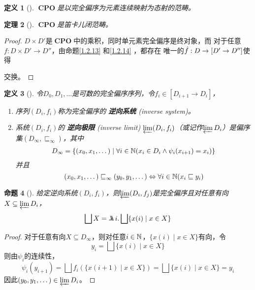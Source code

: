 \documentclass{jams-l}
\DeclareMathOperator{\CPO}{\textbf{CPO}}
\newtheorem{theorem}{定理}[section]
\newtheorem{proposition}[theorem]{命题}
\newtheorem{definition}[theorem]{定义}
\begin{document}
\begin{definition}[]
\(\CPO\)是以完全偏序为元素连续映射为态射的范畴。
\end{definition}

\begin{theorem}[]
\(\CPO\)是笛卡儿闭范畴。
\end{theorem}

\begin{proof}
\(D\times D'\)是\(\CPO\)中的乘积，同时单元素完全偏序是终对象，而
对于任意\(f:D\times D'\to D''\)，由命题\ref{1.2.13} 和\ref{1.2.14} ，都存在
唯一的\(\hat{f}:D\to[D'\to D'']\)使得
\begin{center}\end{center}
交换。
\end{proof}

\begin{definition}[]
令\(D_0,D_1,\dots\)是可数的完全偏序序列，令\(f_i\in[D_{i+1}\to D_i]\)，
\begin{enumerate}
\item 序列\((D_i,f_i)\)称为完全偏序的 \textbf{逆向系统} (inverse system)。
\item 系统\((D_i,f_i)\)的 \textbf{逆向极限} (inverse limit) \(\varprojlim(D_i,f_i)\)（或记作\(\varprojlim D_i\)）是偏序集\((D_\infty,\sqsubseteq_\infty)\)，其中
\begin{align*}
D_\infty=\{(x_0,x_1,\dots)\mid\forall i\in\mathbb{N}(x_i\in D_i\wedge\psi_i(x_{i+1})=x_i)\}
\end{align*}
并且
\begin{equation*}
(x_0,x_1,\dots)\sqsubseteq_\infty(y_0,y_1,\dots)\Leftrightarrow\forall i\in\mathbb{N}(x_i\sqsubseteq y_i)
\end{equation*}
\end{enumerate}
\end{definition}

\begin{proposition}[]
给定逆向系统\((D_i,f_i)\)，则\(\varprojlim(D_i,f_j)\)是完全偏序且对任意有向\(X\subseteq\varprojlim D_i\)，
\begin{equation*}
\bigsqcup X=\metalambda i.\bigsqcup\{x(i)\mid x\in X\}
\end{equation*}
\end{proposition}

\begin{proof}
对于任意有向\(X\subseteq D_\infty\)，则对任意\(i\in\mathbb{N}\)，\(\{x(i)\mid x\in X\}\)有向，令
\begin{equation*}
y_i=\bigsqcup\{x(i)\mid x\in X\}
\end{equation*}
则由\(\psi_i\)的连续性，
\begin{equation*}
\psi_i(y_{i+1})=\bigsqcup f_i(\{x(i+1)\mid x\in X\})=\bigsqcup\{x(i)\mid x\in X\}=y_i
\end{equation*}
因此\((y_0,y_1,\dots)\in \varprojlim D_i\)。
\end{proof}
\end{document}

